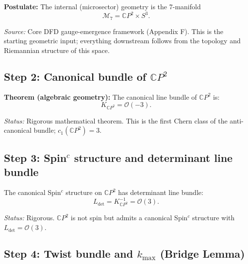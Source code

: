 \documentclass[12pt,a4paper]{article}
\begin{document}
\textbf{Postulate:} The internal (microsector) geometry is the 7-manifold
\begin{equation}\tag{E1}
\mathcal{M}_7 = \mathbb{C}P^2 \times S^3.
\end{equation}

\textit{Source:} Core DFD gauge-emergence framework (Appendix F).
This is the starting geometric input; everything downstream follows from
the topology and Riemannian structure of this space.

\subsection{Step 2: Canonical bundle of $\mathbb{C}P^2$}

\textbf{Theorem (algebraic geometry):} The canonical line bundle of
$\mathbb{C}P^2$ is:
\begin{equation}\tag{E2}
K_{\mathbb{C}P^2} = \mathcal{O}(-3).
\end{equation}

\textit{Status:} Rigorous mathematical theorem.  This is the first Chern
class of the anti-canonical bundle; $c_1(\mathbb{C}P^2) = 3$.

\subsection{Step 3: Spin$^c$ structure and determinant line bundle}

The canonical Spin$^c$ structure on $\mathbb{C}P^2$ has determinant
line bundle:
\begin{equation}\tag{E3}
L_{\det} = K^{-1}_{\mathbb{C}P^2} = \mathcal{O}(3).
\end{equation}

\textit{Status:} Rigorous.  $\mathbb{C}P^2$ is not spin but admits a
canonical Spin$^c$ structure with $L_{\det} = \mathcal{O}(3)$.

\subsection{Step 4: Twist bundle and $k_{\max}$ (Bridge Lemma)}
\end{document}
